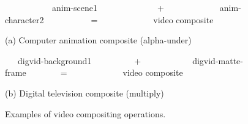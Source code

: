 \begin{figure}[t!]
\centering
\begin{minipage}{0.3\textwidth}
\centering
{}
\vspace{2pt}
\end{minipage}
\begin{minipage}{0.3\textwidth}
\centering
{}
\vspace{2pt}
\end{minipage}
\begin{minipage}{0.3\textwidth}
\centering
{}
\vspace{2pt}
\end{minipage}

{\small ~~~~~~~~~~~anim-scene1~~~~~~~~~~~~~~+~~~~~~~~~~~~~anim-character2~~~~~~~~~~~=~~~~~~~~~~~~~video composite~~~~~~~}

\begin{center}
\vspace{-3pt}
(a) Computer animation composite (alpha-under)
\end{center} \vspace{12pt}

\begin{minipage}{0.3\textwidth}
\centering
{}
\vspace{2pt}
\end{minipage}
\begin{minipage}{0.3\textwidth}
\centering
{}
\vspace{2pt}
\end{minipage}
\begin{minipage}{0.3\textwidth}
\centering
{}
\vspace{2pt}
\end{minipage}

{\small ~~~digvid-background1~~~~~~~~~~+~~~~~~~~~~~~digvid-matte-frame~~~~~~~~=~~~~~~~~~~~~~video composite~~~~~~~}

\begin{center}
\vspace{-3pt}
(b) Digital television composite (multiply)
\end{center}
\vspace{-3pt}
\caption{Examples of video compositing operations.\protect\label{fig:videos}}
\end{figure}

